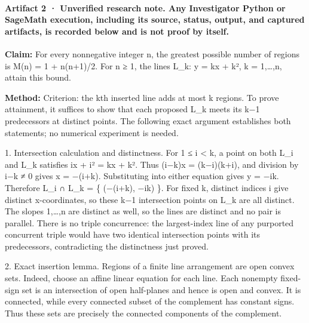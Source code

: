 \documentclass[11pt]{article}
\begin{document}
\paragraph{Artifact 2 · Unverified research note. Any Investigator Python or SageMath execution, including its source, status, output, and captured artifacts, is recorded below and is not proof by itself.}
\textbf{Claim:} For every nonnegative integer n, the greatest possible number of regions is M(n) = 1 + n(n+1)/2. For n ≥ 1, the lines L\_k: y = kx + k², k = 1,…,n, attain this bound.\par
\textbf{Method:} Criterion: the kth inserted line adds at most k regions. To prove attainment, it suffices to show that each proposed L\_k meets its k−1 predecessors at distinct points. The following exact argument establishes both statements; no numerical experiment is needed.

1. Intersection calculation and distinctness. For 1 ≤ i \textless{} k, a point on both L\_i and L\_k satisfies ix + i² = kx + k². Thus (i−k)x = (k−i)(k+i), and division by i−k ≠ 0 gives x = −(i+k). Substituting into either equation gives y = −ik. Therefore L\_i ∩ L\_k = \{ (−(i+k), −ik) \}. For fixed k, distinct indices i give distinct x-coordinates, so these k−1 intersection points on L\_k are all distinct. The slopes 1,…,n are distinct as well, so the lines are distinct and no pair is parallel. There is no triple concurrence: the largest-index line of any purported concurrent triple would have two identical intersection points with its predecessors, contradicting the distinctness just proved.

2. Exact insertion lemma. Regions of a finite line arrangement are open convex sets. Indeed, choose an affine linear equation for each line. Each nonempty fixed-sign set is an intersection of open half-planes and hence is open and convex. It is connected, while every connected subset of the complement has constant signs. Thus these sets are precisely the connected components of the complement.
\end{document}
